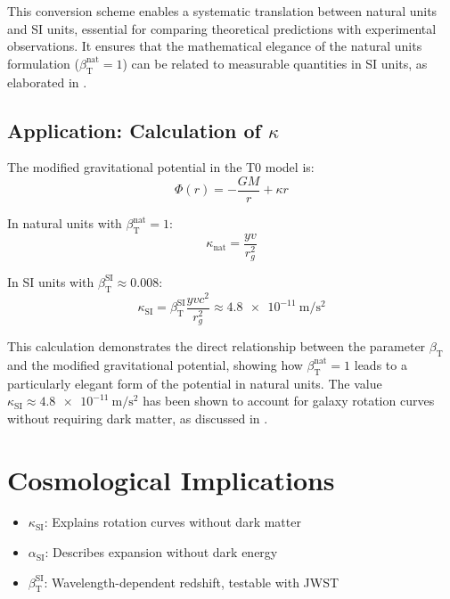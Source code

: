 \documentclass[12pt,a4paper]{article}
\newcommand{\betaT}{\beta_{\text{T}}}
\begin{document}
	This conversion scheme enables a systematic translation between natural units and SI units, essential for comparing theoretical predictions with experimental observations. It ensures that the mathematical elegance of the natural units formulation (\(\betaT^{\text{nat}} = 1\)) can be related to measurable quantities in SI units, as elaborated in \cite{pascher_alphabeta_2025}.
	
	\subsection{Application: Calculation of \(\kappa\)}
	\label{subsec:calculation_kappa}
	
	The modified gravitational potential in the T0 model is:
	\begin{equation}
		\Phi(r) = -\frac{G M}{r} + \kappa r
	\end{equation}
	
	In natural units with \(\betaT^{\text{nat}} = 1\):
	\begin{equation}
		\kappa_{\text{nat}} = \frac{y v}{r_g^2}
	\end{equation}
	
	In SI units with \(\betaT^{\text{SI}} \approx 0.008\):
	\begin{equation}
		\kappa_{\text{SI}} = \betaT^{\text{SI}} \frac{y v c^2}{r_g^2} \approx \SI{4.8e-11}{\meter\per\second\squared}
	\end{equation}
	
	This calculation demonstrates the direct relationship between the parameter \(\betaT\) and the modified gravitational potential, showing how \(\betaT^{\text{nat}} = 1\) leads to a particularly elegant form of the potential in natural units. The value \(\kappa_{\text{SI}} \approx \SI{4.8e-11}{\meter\per\second\squared}\) has been shown to account for galaxy rotation curves without requiring dark matter, as discussed in \cite{pascher_galaxies_2025}.
	
	\section{Cosmological Implications}
	\label{sec:cosmological_implications}
	
	\begin{itemize}
		\item \(\kappa_{\text{SI}}\): Explains rotation curves without dark matter
		\item \(\alpha_{\text{SI}}\): Describes expansion without dark energy
		\item \(\betaT^{\text{SI}}\): Wavelength-dependent redshift, testable with JWST
	\end{itemize}
	
\end{document}
